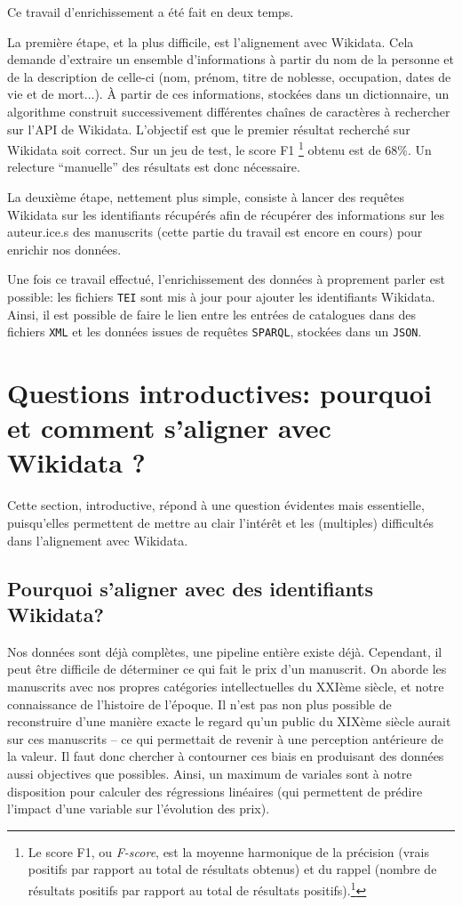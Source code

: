 \documentclass[a4paper, 12pt, twoside]{book}
\newcommand{\json}{\texttt{JSON}}
\newcommand{\sparql}{\texttt{SPARQL}}
\newcommand{\tei}{\texttt{TEI}}
\newcommand{\xml}{\texttt{XML}}
\begin{document}
Ce travail d'enrichissement a été fait en deux temps. 

La première étape, et la plus difficile, est l'alignement avec Wikidata. Cela demande d'extraire un ensemble d'informations à partir du nom de la personne et de la description de celle-ci (nom, prénom, titre de noblesse, occupation, dates de vie et de mort...). À partir de ces informations, stockées dans un dictionnaire, un algorithme construit successivement différentes chaînes de caractères à rechercher sur l'API de Wikidata. L'objectif est que le premier résultat recherché sur Wikidata soit correct. Sur un jeu de test, le score F1 \footnote{Le score F1, ou \textit{F-score}, est la moyenne harmonique de la précision (vrais positifs par rapport au total de résultats obtenus) et du rappel (nombre de résultats positifs par rapport au total de résultats positifs).\footcite{noauthor_precision_2022}} obtenu est de 68\%. Un relecture \enquote{manuelle} des résultats est donc nécessaire.

La deuxième étape, nettement plus simple, consiste à lancer des requêtes Wikidata sur les identifiants récupérés afin de récupérer des informations sur les auteur.ice.s des manuscrits (cette partie du travail est encore en cours) pour enrichir nos données.

Une fois ce travail effectué, l'enrichissement des données à proprement parler est possible: les fichiers \tei{} sont mis à jour pour ajouter les identifiants Wikidata. Ainsi, il est possible de faire le lien entre les entrées de catalogues dans des fichiers \xml{} et les données issues de requêtes \sparql{}, stockées dans un \json.


\section{Questions introductives: pourquoi et comment s'aligner avec Wikidata ?}
Cette section, introductive, répond à une question évidentes mais essentielle, puisqu'elles permettent de mettre au clair l'intérêt et les (multiples) difficultés dans l'alignement avec Wikidata.

\subsection{Pourquoi s'aligner avec des identifiants Wikidata?} 
Nos données sont déjà complètes, une pipeline entière existe déjà. Cependant, il peut être difficile de déterminer ce qui fait le prix d'un manuscrit. On aborde les manuscrits avec nos propres catégories intellectuelles du XXIème siècle, et notre connaissance de l'histoire de l'époque. Il n'est pas non plus possible de reconstruire d'une manière exacte le regard qu'un public du XIXème siècle aurait sur ces manuscrits -- ce qui permettait de revenir à une perception antérieure de la valeur. Il faut donc chercher à contourner ces biais en produisant des données aussi objectives que possibles. Ainsi, un maximum de variales sont à notre disposition pour calculer des régressions linéaires (qui permettent de prédire l'impact d'une variable sur l'évolution des prix).
\end{document}
